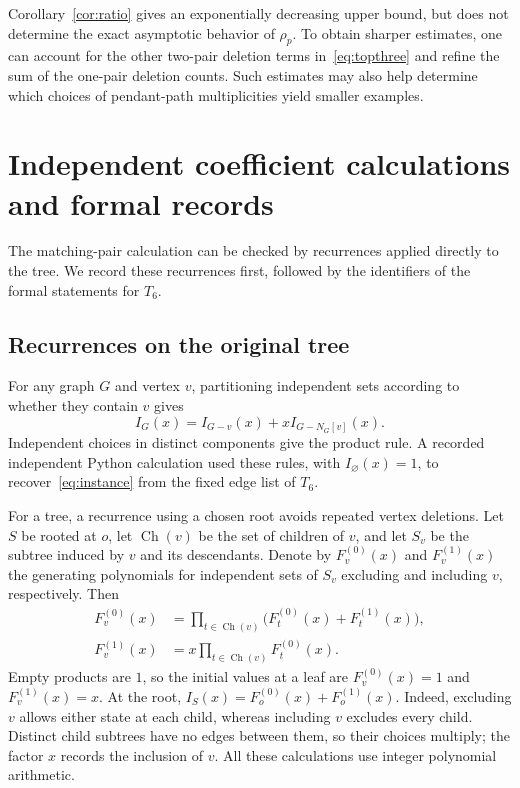\documentclass[11pt,a4paper]{article}
\theoremstyle{remark}
\numberwithin{equation}{section}
\begin{document}
Corollary~\ref{cor:ratio} gives an exponentially decreasing upper
bound, but does not determine the exact asymptotic behavior of
$\rho_p$. To obtain sharper estimates, one can account for the other
two-pair deletion terms in~\eqref{eq:topthree} and refine the sum of
the one-pair deletion counts. Such estimates may also help determine
which choices of pendant-path multiplicities yield smaller examples.

\appendix
\section{Independent coefficient calculations and formal records}\label{app:verification}

The matching-pair calculation can be checked by recurrences applied
directly to the tree. We record these recurrences first, followed by
the identifiers of the formal statements for $T_6$.

\subsection{Recurrences on the original tree}\label{app:rooted-recurrence}

For any graph $G$ and vertex $v$, partitioning independent sets
according to whether they contain $v$ gives
\begin{equation}\label{eq:vertex-recurrence}
 I_G(x)=I_{G-v}(x)+xI_{G-N_G[v]}(x).
\end{equation}
Independent choices in distinct components give the product rule.
A recorded independent Python calculation used these rules, with
$I_{\varnothing}(x)=1$, to recover~\eqref{eq:instance} from the
fixed edge list of $T_6$.

For a tree, a recurrence using a chosen root avoids repeated vertex
deletions. Let $S$ be rooted at $o$, let $\operatorname{Ch}(v)$ be the
set of children of $v$, and let $S_v$ be the subtree induced by $v$
and its descendants. Denote by $F_v^{(0)}(x)$ and $F_v^{(1)}(x)$ the
generating polynomials for independent sets of $S_v$ excluding and
including $v$, respectively. Then
\begin{equation}\label{eq:rooted-recurrence}
\begin{aligned}
 F_v^{(0)}(x)
 &=\prod_{t\in\operatorname{Ch}(v)}
       \bigl(F_t^{(0)}(x)+F_t^{(1)}(x)\bigr),\\
 F_v^{(1)}(x)
 &=x\prod_{t\in\operatorname{Ch}(v)}F_t^{(0)}(x).
\end{aligned}
\end{equation}
Empty products are $1$, so the initial values at a leaf are
$F_v^{(0)}(x)=1$ and $F_v^{(1)}(x)=x$.
At the root, $I_S(x)=F_o^{(0)}(x)+F_o^{(1)}(x)$.
Indeed, excluding $v$ allows either state at each child, whereas
including $v$ excludes every child. Distinct child subtrees have no
edges between them, so their choices multiply; the factor $x$
records the inclusion of $v$.
All these calculations use integer polynomial arithmetic.
\end{document}
